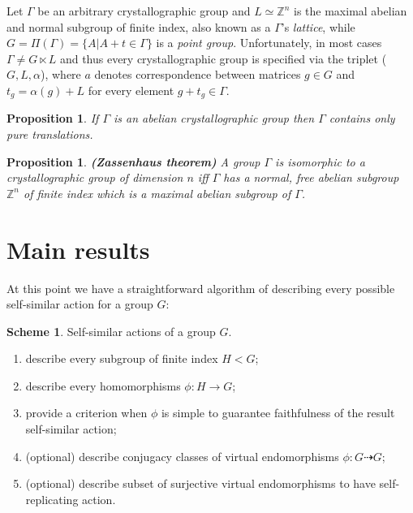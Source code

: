 \documentclass[a4paper,12pt]{amsart}
\newtheorem{proposition}[theorem]{Proposition}
\theoremstyle{definition}
\newtheorem{algorithm}{Scheme}
\begin{document}
	
	Let $\Gamma$ be an arbitrary crystallographic group and $L \simeq \mathbb{Z}^n$ is the maximal abelian and normal subgroup of finite index, also known as a $\Gamma$'s \textit{lattice}, while $G = \Pi(\Gamma) =  \{A | A + t \in \Gamma\}$ is a \textit{point group}. Unfortunately, in most cases $\Gamma \neq G \ltimes L$ and thus every crystallographic group is specified via the triplet ($G, L, \alpha$), where $a$ denotes correspondence between matrices $g \in G$ and $t_g = \alpha(g) + L$ for every element $g + t_g \in \Gamma.$ 
		
	\begin{proposition}
	
		If $\Gamma$ is an abelian crystallographic group then $\Gamma$ contains only pure translations.  	
		
	\end{proposition}

	\begin{proposition}
		\textbf{(Zassenhaus theorem)} A group $\Gamma$ is isomorphic to a crystallographic group of dimension $n$ iff $\Gamma$ has a normal, free abelian subgroup $\mathbb{Z}^n$ of finite index which is a maximal abelian subgroup of $\Gamma$.	
	
	\end{proposition}
	\newpage	
	\section{Main results}\label{section: main results}
	
	
	
	At this point we have a straightforward algorithm of describing every possible self-similar action for a group $G$: 
	
	
	\begin{algorithm}  Self-similar actions of a group $G$.
		
	\begin{enumerate}[label=\arabic*.]
		\item describe every subgroup of finite index $H < G$; 
		\item describe every homomorphisms $\phi : H \rightarrow G$;
		\item provide a criterion when $\phi$ is simple to guarantee faithfulness of the result self-similar action;
		\item (optional) describe conjugacy classes of virtual endomorphisms $\phi: G \dashrightarrow G$;
		\item (optional) describe subset of surjective virtual endomorphisms to have self-replicating action.
	\end{enumerate}
		
	\end{algorithm}
	
\end{document}
